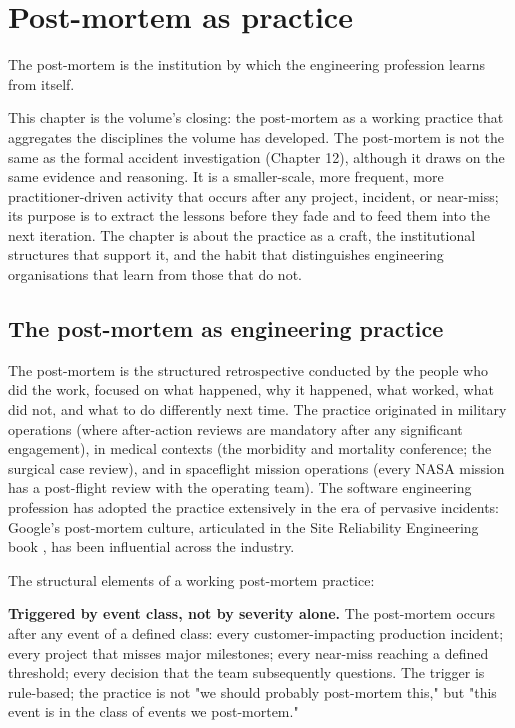 \chapter{Post-mortem as practice}
\label{vol10:ch16}

\epigraph{The post-mortem is the institution by which the engineering profession learns from itself.}{}


\noindent
This chapter is the volume's closing: the post-mortem as a working practice that aggregates the disciplines the volume has developed. The post-mortem is not the same as the formal accident investigation (Chapter 12), although it draws on the same evidence and reasoning. It is a smaller-scale, more frequent, more practitioner-driven activity that occurs after any project, incident, or near-miss; its purpose is to extract the lessons before they fade and to feed them into the next iteration. The chapter is about the practice as a craft, the institutional structures that support it, and the habit that distinguishes engineering organisations that learn from those that do not.

\section{The post-mortem as engineering practice}

The post-mortem is the structured retrospective conducted by the people who did the work, focused on what happened, why it happened, what worked, what did not, and what to do differently next time. The practice originated in military operations (where after-action reviews are mandatory after any significant engagement), in medical contexts (the morbidity and mortality conference; the surgical case review), and in spaceflight mission operations (every NASA mission has a post-flight review with the operating team). The software engineering profession has adopted the practice extensively in the era of pervasive incidents: Google's post-mortem culture, articulated in the Site Reliability Engineering book \cite{text:google-sre}, has been influential across the industry.

The structural elements of a working post-mortem practice:

\textbf{Triggered by event class, not by severity alone.} The post-mortem occurs after any event of a defined class: every customer-impacting production incident; every project that misses major milestones; every near-miss reaching a defined threshold; every decision that the team subsequently questions. The trigger is rule-based; the practice is not "we should probably post-mortem this," but "this event is in the class of events we post-mortem."


